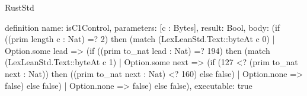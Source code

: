 \begin{lexlean}{RustStd}
\begin{semanticmodule}
definition{
  name: isC1Control,
  parameters: [c : Bytes],
  result: Bool,
  body: (if ((prim length c : Nat) =? 2) then (match (LexLeanStd.Text::byteAt c 0) | Option.some lead => (if ((prim to_nat lead : Nat) =? 194) then (match (LexLeanStd.Text::byteAt c 1) | Option.some next => (if (127 <? (prim to_nat next : Nat)) then ((prim to_nat next : Nat) <? 160) else false) | Option.none => false) else false) | Option.none => false) else false),
  executable: true
}

\end{semanticmodule}
\end{lexlean}
